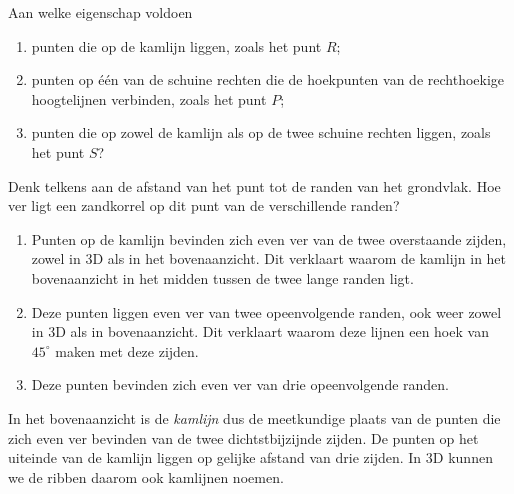 \documentclass{ximera}
\begin{document}

\begin{exercise}
    Aan welke eigenschap voldoen
    \begin{enumerate}[label=(\alph*)]
        \item punten die op de kamlijn liggen, zoals het punt \(R\);
        \item punten op \'e\'en van de schuine rechten die de hoekpunten van de
            rechthoekige hoogtelijnen verbinden, zoals het punt \(P\);
        \item punten die op zowel de kamlijn als op de twee schuine rechten liggen, zoals
            het punt \(S\)?
    \end{enumerate}
    \begin{hint}
        Denk telkens aan de afstand van het punt tot de randen van het grondvlak. Hoe ver
        ligt een zandkorrel op dit punt van de verschillende randen?
    \end{hint}
    \begin{oplossing}
        \begin{enumerate}[label=(\alph*)]
            \item Punten op de kamlijn bevinden zich even ver van de twee overstaande
                zijden, zowel in 3D als in het bovenaanzicht. Dit verklaart waarom de
                kamlijn in het bovenaanzicht in het midden tussen de twee lange randen ligt.
            \item Deze punten liggen even ver van twee opeenvolgende randen, ook weer zowel
                in 3D als in bovenaanzicht. Dit verklaart waarom deze lijnen een hoek van
                \(45^\circ\) maken met deze zijden.
            \item Deze punten bevinden zich even ver van drie opeenvolgende randen.
        \end{enumerate}
    \end{oplossing}
\end{exercise}


In het bovenaanzicht is de \textit{kamlijn} dus de meetkundige plaats van de punten die
zich even ver bevinden van de twee dichtstbijzijnde zijden. De punten op het uiteinde van
de kamlijn liggen op gelijke afstand van drie zijden. In 3D kunnen we de ribben daarom ook
kamlijnen noemen.
\end{document}
